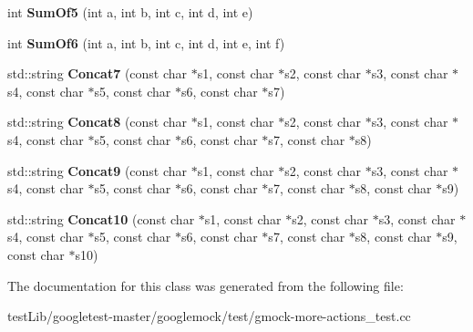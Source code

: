 \begin{DoxyCompactItemize}
\item 
\mbox{\label{classtesting_1_1gmock__more__actions__test_1_1Foo_a55fb0cdc224c450f401e0fea4f979512}} 
int {\bfseries Sum\+Of5} (int a, int b, int c, int d, int e)
\item 
\mbox{\label{classtesting_1_1gmock__more__actions__test_1_1Foo_a34b5ae7cd4620331af92c637e3534bc4}} 
int {\bfseries Sum\+Of6} (int a, int b, int c, int d, int e, int f)
\item 
\mbox{\label{classtesting_1_1gmock__more__actions__test_1_1Foo_a5ff9313371e65a91b086afdc2032b0eb}} 
std\+::string {\bfseries Concat7} (const char $\ast$s1, const char $\ast$s2, const char $\ast$s3, const char $\ast$s4, const char $\ast$s5, const char $\ast$s6, const char $\ast$s7)
\item 
\mbox{\label{classtesting_1_1gmock__more__actions__test_1_1Foo_a25b91cea8633d026fe3f4a36c1574b8e}} 
std\+::string {\bfseries Concat8} (const char $\ast$s1, const char $\ast$s2, const char $\ast$s3, const char $\ast$s4, const char $\ast$s5, const char $\ast$s6, const char $\ast$s7, const char $\ast$s8)
\item 
\mbox{\label{classtesting_1_1gmock__more__actions__test_1_1Foo_a8f5b145b0cd23055630b2f9d10b3f45b}} 
std\+::string {\bfseries Concat9} (const char $\ast$s1, const char $\ast$s2, const char $\ast$s3, const char $\ast$s4, const char $\ast$s5, const char $\ast$s6, const char $\ast$s7, const char $\ast$s8, const char $\ast$s9)
\item 
\mbox{\label{classtesting_1_1gmock__more__actions__test_1_1Foo_ad5b1d2dd1bcec98fdc90a05487ec3b14}} 
std\+::string {\bfseries Concat10} (const char $\ast$s1, const char $\ast$s2, const char $\ast$s3, const char $\ast$s4, const char $\ast$s5, const char $\ast$s6, const char $\ast$s7, const char $\ast$s8, const char $\ast$s9, const char $\ast$s10)
\end{DoxyCompactItemize}


The documentation for this class was generated from the following file\+:\begin{DoxyCompactItemize}
\item 
test\+Lib/googletest-\/master/googlemock/test/gmock-\/more-\/actions\+\_\+test.\+cc\end{DoxyCompactItemize}
